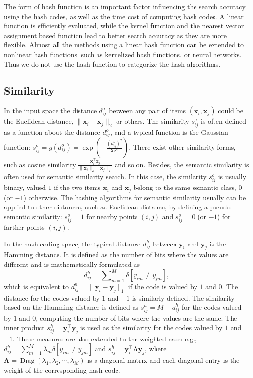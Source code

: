 \documentclass[10pt,journal,compsoc]{IEEEtran}
\begin{document}
The form of hash function is an important factor
influencing the search accuracy using the hash codes,
as well as the time cost of computing hash codes.
A linear function is efficiently evaluated,
while the kernel function and the nearest vector assignment based function
lead to better search accuracy
as they are more flexible.
Almost all the methods using a linear hash function
can be extended to nonlinear hash functions,
such as kernelized hash functions, or
neural networks.
Thus we do not use the hash function to categorize the hash algorithms.







\subsection{Similarity}
In the input space
the distance $d^o_{ij}$
between any pair of items $(\mathbf{x}_i, \mathbf{x}_j)$
could be the Euclidean distance, $\| \mathbf{x}_i - \mathbf{x}_j \|_2$
or others.
The similarity $s^o_{ij}$ is often
defined as a function about the distance $d^o_{ij}$,
and a typical function is the Gaussian function:
$s^o_{ij} = g(d^o_{ij}) = \exp{(-\frac{(d^o_{ij})^2}{2\sigma^2})}$.
There exist other similarity forms,
such as
cosine similarity $\frac{\mathbf{x}_i^\top\mathbf{x}_j}{\|\mathbf{x}_i\|_2 \|\mathbf{x}_j\|_2}$
and so on.
Besides,
the semantic similarity is often used
for semantic similarity search.
In this case, the similarity $s^o_{ij}$
is usually binary,
valued $1$ if the two items $\mathbf{x}_i$ and $\mathbf{x}_j$
belong to the same semantic class,
$0$ (or $-1$) otherwise.
The hashing algorithms for semantic similarity
usually can be applied to other distances, such as Euclidean distance,
by defining a pseudo-semantic similarity:
$s^o_{ij} = 1$ for nearby points $(i,j)$
and $s^o_{ij} = 0$ (or $-1$)
for farther points $(i,j)$.

In the hash coding space,
the typical distance $d^h_{ij}$
between $\mathbf{y}_i$ and $\mathbf{y}_j$
is the Hamming distance.
It is
defined as
the number of bits
where the values are different
and is mathematically formulated
as
$$d^h_{ij} = \sum\nolimits_{m=1}^M \delta[y_{im} \neq y_{jm}],$$
which is equivalent to $d^h_{ij} = \|\mathbf{y}_i - \mathbf{y}_j\|_1$
if the code is valued by $1$ and $0$.
The distance for the codes valued by $1$ and $-1$
is similarly defined.
The similarity based on the Hamming distance
is defined as
$s^h_{ij} = M - d^h_{ij}$
for the codes valued by $1$ and $0$,
computing the number of bits
where the values are the same.
The inner product $s^h_{ij} = \mathbf{y}_i^\top \mathbf{y}_j$ is used as the similarity
for the codes valued by $1$ and $-1$.
These measures are also extended to the weighted case:
e.g.,
$d^h_{ij} = \sum_{m=1}^M \lambda_m \delta[y_{im} \neq y_{jm}]$
and $s^h_{ij} = \mathbf{y}_i^\top \boldsymbol{\Lambda} \mathbf{y}_j$,
where $\boldsymbol{\Lambda} = \operatorname{Diag}(\lambda_1, \lambda_2, \cdots, \lambda_M)$ is a diagonal matrix
and each diagonal entry is the weight
of the corresponding hash code.
\end{document}
